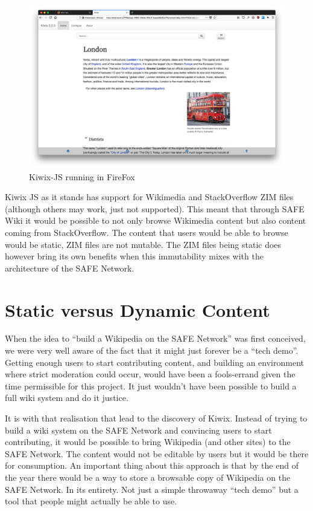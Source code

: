 \begin{figure}
	\begin{center}
			\includegraphics[width=\textwidth]{images/kiwix-js-extension}
		\caption{Kiwix-JS running in FireFox}
		\label{fig:kiwix-firefox}
	\end{center}
\end{figure}

Kiwix JS as it stands has support for Wikimedia and StackOverflow ZIM files (although others may work, just not supported). This meant that through SAFE Wiki it would be possible to not only browse Wikimedia content but also content coming from StackOverflow. The content that users would be able to browse would be static, ZIM files are not mutable. The ZIM files being static does however bring its own benefits when this immutability mixes with the architecture of the SAFE Network.

\section{Static versus Dynamic Content}

When the idea to ``build a Wikipedia on the SAFE Network'' was first conceived, we were very well aware of the fact that it might just forever be a ``tech demo''. Getting enough users to start contributing content, and building an environment where strict moderation could occur, would have been a fools-errand given the time permissible for this project. It just wouldn't have been possible to build a full wiki system and do it justice.

It is with that realisation that lead to the discovery of Kiwix. Instead of trying to build a wiki system on the SAFE Network and convincing users to start contributing, it would be possible to bring Wikipedia (and other sites) to the SAFE Network. The content would not be editable by users but it would be there for consumption. An important thing about this approach is that by the end of the year there would be a way to store a browsable copy of Wikipedia on the SAFE Network. In its entirety. Not just a simple throwaway ``tech demo'' but a tool that people might actually be able to use.

